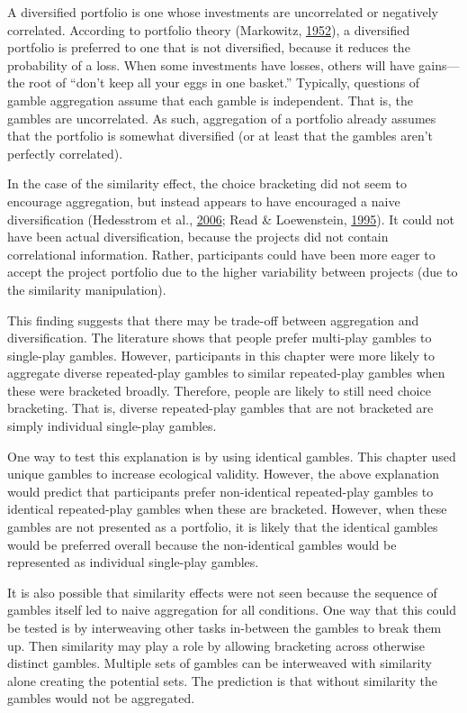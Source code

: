 \documentclass[
  english,
  man, donotrepeattitle,floatsintext]{apa7}
\theoremstyle{definition}
\theoremstyle{definition}
\theoremstyle{definition}
\theoremstyle{definition}
\theoremstyle{remark}
\begin{document}
A diversified portfolio is one whose investments are uncorrelated or negatively
correlated. According to portfolio theory (Markowitz, \protect\hyperlink{ref-markowitz1952}{1952}), a diversified
portfolio is preferred to one that is not diversified, because it reduces the
probability of a loss. When some investments have losses, others will have
gains---the root of ``don't keep all your eggs in one basket.'' Typically,
questions of gamble aggregation assume that each gamble is independent. That is,
the gambles are uncorrelated. As such, aggregation of a portfolio already
assumes that the portfolio is somewhat diversified (or at least that the gambles
aren't perfectly correlated).

In the case of the similarity effect, the choice bracketing did not seem to
encourage aggregation, but instead appears to have encouraged a naive
diversification (Hedesstrom et al., \protect\hyperlink{ref-hedesstrom2006}{2006}; Read \& Loewenstein, \protect\hyperlink{ref-read1995}{1995}). It could not have been actual
diversification, because the projects did not contain correlational information.
Rather, participants could have been more eager to accept the project portfolio
due to the higher variability between projects (due to the similarity
manipulation).

This finding suggests that there may be trade-off between aggregation and
diversification. The literature shows that people prefer multi-play gambles to
single-play gambles. However, participants in this chapter were more likely to
aggregate diverse repeated-play gambles to similar repeated-play gambles when
these were bracketed broadly. Therefore, people are likely to still need choice
bracketing. That is, diverse repeated-play gambles that are not bracketed are
simply individual single-play gambles.

One way to test this explanation is by using identical gambles. This chapter
used unique gambles to increase ecological validity. However, the above
explanation would predict that participants prefer non-identical repeated-play
gambles to identical repeated-play gambles when these are bracketed. However,
when these gambles are not presented as a portfolio, it is likely that the
identical gambles would be preferred overall because the non-identical gambles
would be represented as individual single-play gambles.

It is also possible that similarity effects were not seen because the sequence
of gambles itself led to naive aggregation for all conditions. One way that this
could be tested is by interweaving other tasks in-between the gambles to break
them up. Then similarity may play a role by allowing bracketing across otherwise
distinct gambles. Multiple sets of gambles can be interweaved with similarity
alone creating the potential sets. The prediction is that without similarity the
gambles would not be aggregated.
\end{document}
